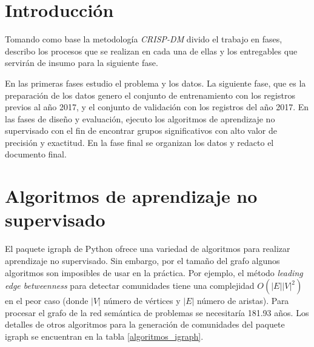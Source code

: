 \section{Introducción}
Tomando como base la metodología \textit{\acrfull{CRISP-DM}} divido el trabajo en fases, describo los procesos que se realizan en cada una de ellas y los entregables que servirán de insumo para la siguiente fase.

En las primeras fases estudio el problema y los datos. La siguiente fase, que es la preparación de los datos genero el conjunto de entrenamiento con los registros previos al año 2017, y el conjunto de validación con los registros del año 2017. En las fases de diseño y evaluación, ejecuto los algoritmos de aprendizaje no supervisado con el fin de encontrar grupos significativos con alto valor de precisión y exactitud. En la fase final se organizan los datos y  redacto el documento final.

\section{Algoritmos de aprendizaje no supervisado}
\label{par:aprendizaje_nosupervisado}
El paquete igraph\cite{igraph} de Python ofrece una variedad de algoritmos para realizar aprendizaje no supervisado. Sin embargo, por el tamaño del grafo algunos algoritmos son imposibles de usar en la práctica. Por ejemplo, el método \textit{leading edge betweenness} para detectar comunidades tiene una complejidad $O(|E||V|^2)$ en el peor caso (donde $|V|$ número de vértices y $|E|$ número de aristas). Para procesar el grafo de la red semántica de problemas se necesitaría 181.93 años. Los detalles de otros algoritmos para la generación de comunidades del paquete igraph se encuentran en la tabla \ref{algoritmos_igraph}.

